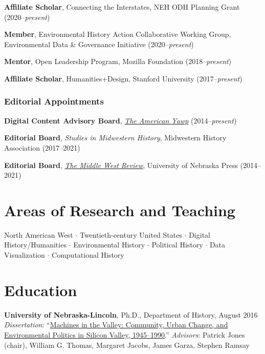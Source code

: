 \textbf{Affiliate Scholar}, Connecting the Interstates, NEH ODH Planning
Grant (2020--\emph{present})

\textbf{Member}, Environmental History Action Collaborative Working
Group, Environmental Data \& Governance Initiative
(2020--\emph{present})

\textbf{Mentor}, Open Leadership Program, Mozilla Foundation
(2018--\emph{present})

\textbf{Affiliate Scholar}, Humanities+Design, Stanford University
(2017--\emph{present})

\vspace{0.2cm}

\subsubsection{Editorial Appointments}\label{editorial-appointments}

\textbf{Digital Content Advisory Board},
\emph{\href{http://www.americanyawp.com/}{The American Yawp}}
(2014--\emph{present})

\textbf{Editorial Board}, \emph{Studies in Midwestern History},
Midwestern History Association (2017--2021)

\textbf{Editorial Board},
\emph{\href{https://uimiddle.wordpress.com/}{The Middle West Review}},
University of Nebraska Press (2014--2021)

\section{Areas of Research and
Teaching}\label{areas-of-research-and-teaching}

North American West \(\cdot\) Twentieth-century United States \(\cdot\)
Digital History/Humanities \(\cdot\) Environmental History \(\cdot\)
Political History \(\cdot\) Data Visualization \(\cdot\) Computational
History

\section{Education}\label{education}

\textbf{University of Nebraska-Lincoln}, Ph.D., Department of History,
August 2016\\
\emph{Dissertation}:
``\href{http://digitalcommons.unl.edu/historydiss/86/}{Machines in the
Valley: Community, Urban Change, and Environmental Politics in Silicon
Valley, 1945--1990}.'' \emph{Advisors}: Patrick Jones (chair), William
G. Thomas, Margaret Jacobs, James Garza, Stephen Ramsay

